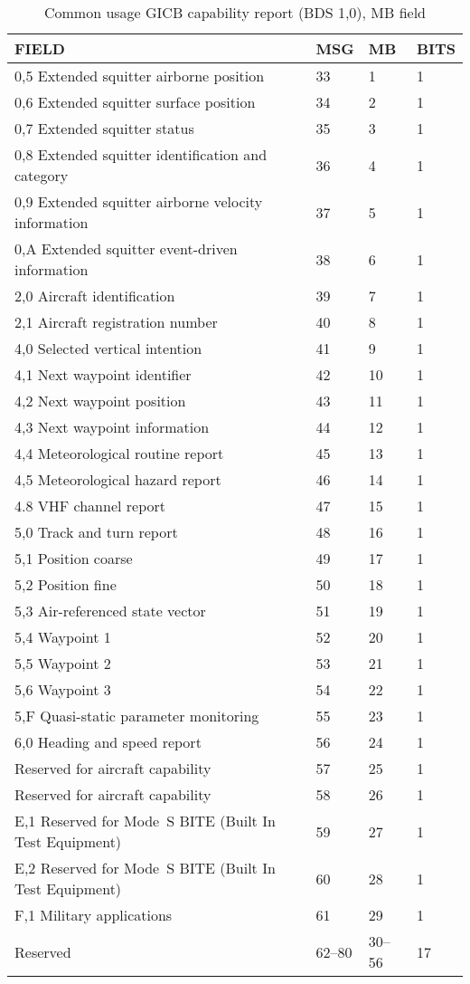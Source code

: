 \begin{table}[ht]
\footnotesize
\centering
\caption{Common usage GICB capability report (BDS 1,0), MB field}
\label{tb:bds17}
\begin{tabular}{|l|l|l|l|}
\hline
\textbf{FIELD} & \textbf{MSG} & \textbf{MB} & \textbf{BITS} \\ \hline
0,5 Extended squitter airborne position & 33 & 1 & 1 \\ \hline
0,6 Extended squitter surface position & 34 & 2 & 1 \\ \hline
0,7 Extended squitter status & 35 & 3 & 1 \\ \hline
0,8 Extended squitter identification and category & 36 & 4 & 1 \\ \hline
0,9 Extended squitter airborne velocity information & 37 & 5 & 1 \\ \hline
0,A Extended squitter event-driven information & 38 & 6 & 1 \\ \hline
2,0 Aircraft identification & 39 & 7 & 1 \\ \hline
2,1 Aircraft registration number & 40 & 8 & 1 \\ \hline
4,0 Selected vertical intention & 41 & 9 & 1 \\ \hline
4,1 Next waypoint identifier & 42 & 10 & 1 \\ \hline
4,2 Next waypoint position & 43 & 11 & 1 \\ \hline
4,3 Next waypoint information & 44 & 12 & 1 \\ \hline
4,4 Meteorological routine report & 45 & 13 & 1 \\ \hline
4,5 Meteorological hazard report & 46 & 14 & 1 \\ \hline
4.8 VHF channel report & 47 & 15 & 1 \\ \hline
5,0 Track and turn report & 48 & 16 & 1 \\ \hline
5,1 Position coarse & 49 & 17 & 1 \\ \hline
5,2 Position fine & 50 & 18 & 1 \\ \hline
5,3 Air-referenced state vector & 51 & 19 & 1 \\ \hline
5,4 Waypoint 1 & 52 & 20 & 1 \\ \hline
5,5 Waypoint 2 & 53 & 21 & 1 \\ \hline
5,6 Waypoint 3 & 54 & 22 & 1 \\ \hline
5,F Quasi-static parameter monitoring & 55 & 23 & 1 \\ \hline
6,0 Heading and speed report & 56 & 24 & 1 \\ \hline
Reserved for aircraft capability & 57 & 25 & 1 \\ \hline
Reserved for aircraft capability & 58 & 26 & 1 \\ \hline
E,1 Reserved for Mode~S BITE (Built In Test Equipment) & 59 & 27 & 1 \\ \hline
E,2 Reserved for Mode~S BITE (Built In Test Equipment) & 60 & 28 & 1 \\ \hline
F,1 Military applications & 61 & 29 & 1 \\ \hline
Reserved & 62--80 & 30--56 & 17 \\ \hline
\end{tabular}
\end{table}

